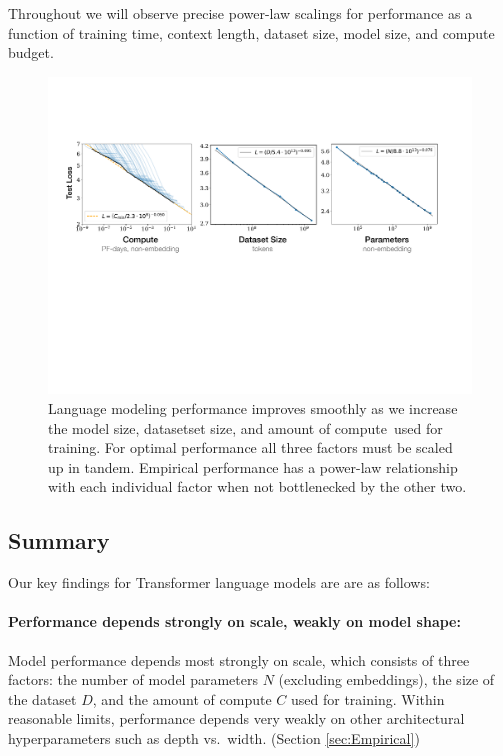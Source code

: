 \documentclass[english]{article}
\begin{document}
Throughout we will observe precise power-law scalings for performance as a function of training time, context length, dataset size, model size, and compute budget.  

\begin{figure}
\noindent \centering{} 
\includegraphics[width=\textwidth]{SimplePowerLaws}

\caption[Summary of simple power laws.]{Language modeling performance improves smoothly as we increase the model size, datasetset size, and amount of compute\footnotemark~used for training.  For optimal performance all three factors must be scaled up in tandem. Empirical performance has a power-law relationship with each individual factor when not bottlenecked by the other two.  \label{fig:BasicPowerLaws}}
\end{figure}


\subsection{Summary}


Our key findings for Transformer language models are are as follows:

\paragraph{Performance depends strongly on scale, weakly on model shape:} Model performance depends most strongly on scale, which consists of three factors: the number of model parameters $N$ (excluding embeddings), the size of the dataset $D$, and the amount of compute $C$ used for training.  Within reasonable limits, performance depends very weakly on other architectural hyperparameters such as depth vs.~width. (Section \ref{sec:Empirical})
\end{document}
